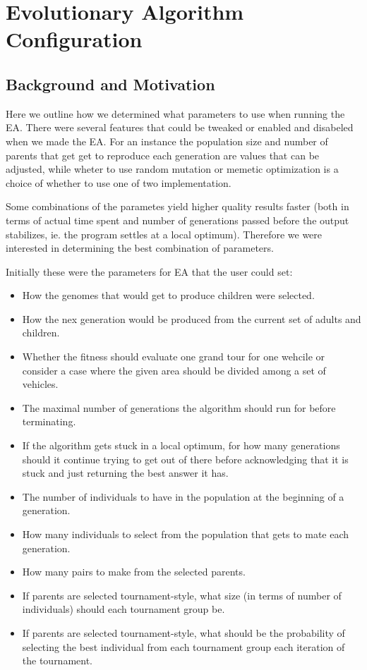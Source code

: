 \chapter{Evolutionary Algorithm Configuration} %
\label{cha:evolutionary_algorithm_configuration}

\section{Background and Motivation} %
\label{sec:background_and_motivation}
Here we outline how we determined what parameters to use when running the EA. There were several features that could be tweaked or enabled and disabeled when we made the EA. For an instance the population size and number of parents that get get to reproduce each generation are values that can be adjusted, while wheter to use random mutation or memetic optimization is a choice of whether to use one of two implementation.

Some combinations of the parametes yield higher quality results faster (both in terms of actual time spent and number of generations passed before the output stabilizes, ie. the program settles at a local optimum). Therefore we were interested in determining the best combination of parameters.

Initially these were the parameters for EA that the user could set:
\begin{itemize}
	\item How the genomes that would get to produce children were selected.
	\item How the nex generation would be produced from the current set of adults and children.
	\item Whether the fitness should evaluate one grand tour for one wehcile or consider a case where the given area should be divided among a set of vehicles.
	\item The maximal number of generations the algorithm should run for before terminating.
	\item If the algorithm gets stuck in a local optimum, for how many generations should it continue trying to get out of there before acknowledging that it is stuck and just returning the best answer it has.
	\item The number of individuals to have in the population at the beginning of a generation.
	\item How many individuals to select from the population that gets to mate each generation.
	\item How many pairs to make from the selected parents.
	\item If parents are selected tournament-style, what size (in terms of number of individuals) should each tournament group be.
	\item If parents are selected tournament-style, what should be the probability of selecting the best individual from each tournament group each iteration of the tournament.

\end{itemize}

